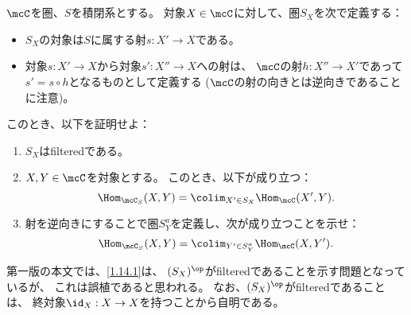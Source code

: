 \documentclass[uplatex,dvipdfmx]{jsarticle}
\begin{document}
\maketitle
\HeaderCommentA
\section{}
\fi



\begin{prob}\label{1.14}
  \(\mcC\)を圏、\(S\)を積閉系とする。
  対象\(X\in \mcC\)に対して、圏\(S_X\)を次で定義する：
  \begin{itemize}
    \item
    \(S_X\)の対象は\(S\)に属する射\(s:X'\to X\)である。
    \item
    対象\(s:X'\to X\)から対象\(s':X''\to X\)への射は、
    \(\mcC\)の射\(h:X''\to X'\)であって
    \(s'=s\circ h\)となるものとして定義する
    (\(\mcC\)の射の向きとは逆向きであることに注意)。
  \end{itemize}
  このとき、以下を証明せよ：
  \begin{enumerate}
    \item \label{1.14.1}
    \(S_X\)はfilteredである。
    \item \label{1.14.2}
    \(X,Y\in \mcC\)を対象とする。
    このとき、以下が成り立つ：
    \[\Hom_{\mcC_S}(X,Y) = \colim_{X'\in S_X}\Hom_{\mcC}(X',Y).\]
    \item \label{1.14.3}
    射を逆向きにすることで圏\(S_Y^a\)を定義し、次が成り立つことを示せ：
    \[\Hom_{\mcC_S}(X,Y) = \colim_{Y'\in S_Y^a}\Hom_{\mcC}(X,Y').\]
  \end{enumerate}
\end{prob}

\begin{rem*}
  第一版の本文では、\ref{1.14.1}は、
  \((S_X)^{\op}\)がfilteredであることを示す問題となっているが、
  これは誤植であると思われる。
  なお、\((S_X)^{\op}\)がfilteredであることは、
  終対象\(\id_X:X\to X\)を持つことから自明である。
\end{rem*}
\end{document}

